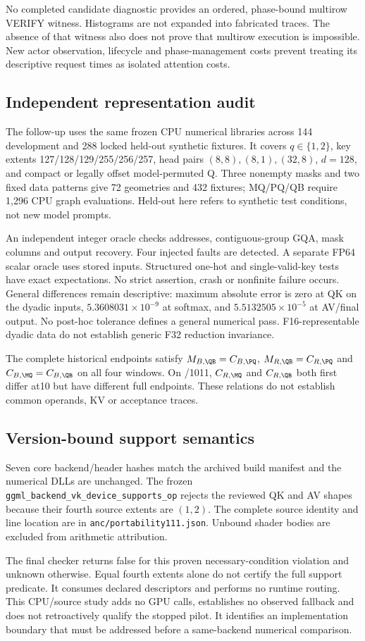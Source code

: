 No completed candidate diagnostic provides an ordered, phase-bound multirow VERIFY witness. Histograms are not expanded into fabricated traces. The absence of that witness also does not prove that multirow execution is impossible. New actor observation, lifecycle and phase-management costs prevent treating its descriptive request times as isolated attention costs.

\subsection{Independent representation audit}
The follow-up uses the same frozen CPU numerical libraries across 144 development and 288 locked held-out synthetic fixtures. It covers $q\in\{1,2\}$, key extents 127/128/129/255/256/257, head pairs $(8,8),(8,1),(32,8)$, $d=128$, and compact or legally offset model-permuted Q. Three nonempty masks and two fixed data patterns give 72 geometries and 432 fixtures; MQ/PQ/QB require 1,296 CPU graph evaluations. Held-out here refers to synthetic test conditions, not new model prompts.

An independent integer oracle checks addresses, contiguous-group GQA, mask columns and output recovery. Four injected faults are detected. A separate FP64 scalar oracle uses stored inputs. Structured one-hot and single-valid-key tests have exact expectations. No strict assertion, crash or nonfinite failure occurs. General differences remain descriptive: maximum absolute error is zero at QK on the dyadic inputs, $5.3608031\!\times\!10^{-9}$ at softmax, and $5.5132505\!\times\!10^{-5}$ at AV/final output. No post-hoc tolerance defines a general numerical pass. F16-representable dyadic data do not establish generic F32 reduction invariance.

The complete historical endpoints satisfy $M_{B,\QB}=C_{B,\PQ}$, $M_{R,\QB}=C_{R,\PQ}$ and $C_{B,\MQ}=C_{B,\QB}$ on all four windows. On /1011, $C_{R,\MQ}$ and $C_{R,\QB}$ both first differ at10 but have different full endpoints. These relations do not establish common operands, KV or acceptance traces.

\subsection{Version-bound support semantics}
Seven core backend/header hashes match the archived build manifest and the numerical DLLs are unchanged. The frozen \texttt{ggml\_backend\_vk\_device\_supports\_op} rejects the reviewed QK and AV shapes because their fourth source extents are $(1,2)$. The complete source identity and line location are in \texttt{anc/portability111.json}. Unbound shader bodies are excluded from arithmetic attribution.

The final checker returns false for this proven necessary-condition violation and unknown otherwise. Equal fourth extents alone do not certify the full support predicate. It consumes declared descriptors and performs no runtime routing. This CPU/source study adds no GPU calls, establishes no observed fallback and does not retroactively qualify the stopped pilot. It identifies an implementation boundary that must be addressed before a same-backend numerical comparison.
